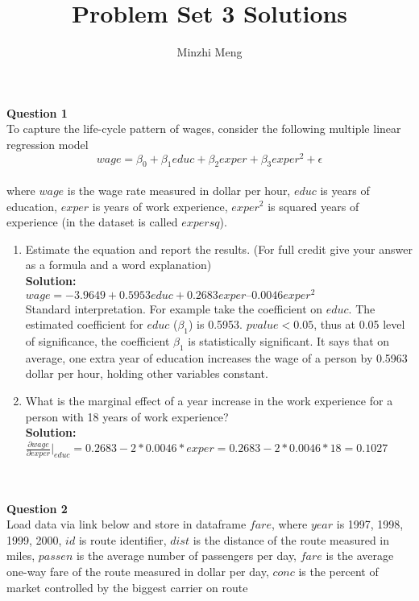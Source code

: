 \documentclass[12pt]{article}
\begin{document}
\title{Problem Set 3 Solutions} 
\author{Minzhi Meng}
\maketitle


{\bf Question 1} 
\bigskip\\
To capture the life-cycle pattern of wages, consider the following multiple linear regression model
$$wage = \beta_0 + \beta_1educ + \beta_2exper + \beta_3exper^2 + \epsilon $$\\
where $wage$ is the wage rate measured in dollar per hour, $educ$ is years of education, $exper$ is years of work experience, $exper^2$ is squared years of experience (in the dataset is called $expersq$). 

\begin{enumerate}[(1)]

\item Estimate the equation and report the results. (For full credit give your answer as a formula and a word explanation)
\smallskip\\
{\bf Solution:\\}
$wage = -3.9649 + 0.5953educ + 0.2683exper – 0.0046exper^2$\\
Standard interpretation. For example take the coefficient on $educ$. The estimated coefficient for $educ$ ($\beta_{1}$) is 0.5953. $p value < 0.05$, thus at 0.05 level of significance, the coefficient $\beta_1$ is statistically significant. It says that on average, one extra year of education increases the wage of a person by 0.5963 dollar per hour, holding other variables constant.

\item What is the marginal effect of a year increase in the work experience for a person with 18 years of work experience?
\smallskip\\
{\bf Solution:}
\smallskip\\
$\frac{\partial wage}{\partial exper}|_{educ}  = 0.2683 - 2 * 0.0046 * exper = 0.2683 - 2 * 0.0046 * 18 = 0.1027$


\end{enumerate}




\bigskip\\
\bigskip\\
{\bf Question 2}
\bigskip\\
Load data via link below and store in dataframe $fare$, where $year$ is 1997, 1998, 1999, 2000, $id$ is route identifier, $dist$ is the distance of the route measured in miles, $passen$ is the average number of passengers per day, $fare$ is the average one-way fare of the route measured in dollar per day, $conc$ is the percent of market controlled by the biggest carrier on route
\end{document}
